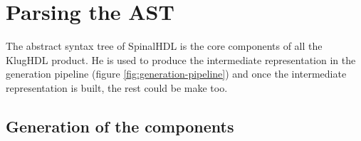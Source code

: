 \chapter{Parsing the AST}

The abstract syntax tree of SpinalHDL is the core components of all the KlugHDL product. He is used to produce the intermediate representation in the generation pipeline (figure \ref{fig:generation-pipeline}) and once the intermediate representation is built, the rest could be make too.

\section{Generation of the components}
